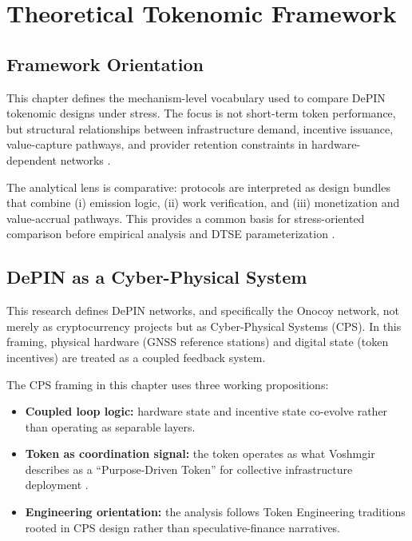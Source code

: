 
\section{Theoretical Tokenomic Framework}
\label{sec:theoretical_framework}

\subsection{Framework Orientation}
This chapter defines the mechanism-level vocabulary used to compare DePIN tokenomic designs under stress. The focus is not short-term token performance, but structural relationships between infrastructure demand, incentive issuance, value-capture pathways, and provider retention constraints in hardware-dependent networks \cite{Ballandies2023, Lin2024}.

The analytical lens is comparative: protocols are interpreted as design bundles that combine (i) emission logic, (ii) work verification, and (iii) monetization and value-accrual pathways. This provides a common basis for stress-oriented comparison before empirical analysis and DTSE parameterization \cite{Morris2019, Braakman2022}.

\subsection{DePIN as a Cyber-Physical System}
\label{subsec:depin_cps}
This research defines DePIN networks, and specifically the Onocoy network, not merely as cryptocurrency projects but as Cyber-Physical Systems (CPS). In this framing, physical hardware (GNSS reference stations) and digital state (token incentives) are treated as a coupled feedback system.

The CPS framing in this chapter uses three working propositions:
\begin{itemize}
    \item \textbf{Coupled loop logic:} hardware state and incentive state co-evolve rather than operating as separable layers.
    \item \textbf{Token as coordination signal:} the token operates as what Voshmgir describes as a ``Purpose-Driven Token'' for collective infrastructure deployment \cite{Voshmgir2020}.
    \item \textbf{Engineering orientation:} the analysis follows Token Engineering traditions rooted in CPS design rather than speculative-finance narratives.
\end{itemize}

